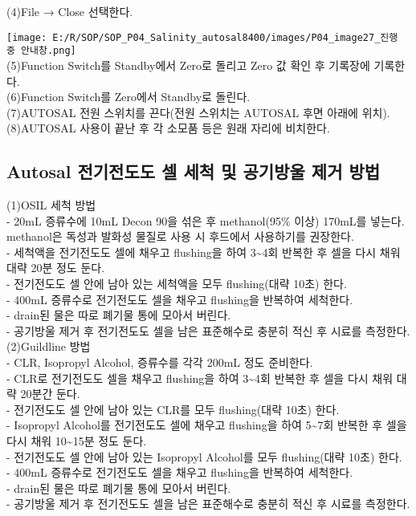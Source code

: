 \documentclass[
]{book}
\begin{document}
(4)File → Close 선택한다.

\texttt{[image: E:/R/SOP/SOP\_P04\_Salinity\_autosal8400/images/P04\_image27\_진행 중 안내창.png]}\\
(5)Function Switch를 Standby에서 Zero로 돌리고 Zero 값 확인 후 기록장에 기록한다.\\
(6)Function Switch를 Zero에서 Standby로 돌린다.\\
(7)AUTOSAL 전원 스위치를 끈다(전원 스위치는 AUTOSAL 후면 아래에 위치).\\
(8)AUTOSAL 사용이 끝난 후 각 소모품 등은 원래 자리에 비치한다.

\hypertarget{autosal-uxc804uxae30uxc804uxb3c4uxb3c4-uxc140-uxc138uxcc99-uxbc0f-uxacf5uxae30uxbc29uxc6b8-uxc81cuxac70-uxbc29uxbc95}{%
\subsection{Autosal 전기전도도 셀 세척 및 공기방울 제거 방법}\label{autosal-uxc804uxae30uxc804uxb3c4uxb3c4-uxc140-uxc138uxcc99-uxbc0f-uxacf5uxae30uxbc29uxc6b8-uxc81cuxac70-uxbc29uxbc95}}

(1)OSIL 세척 방법\\
- 20mL 증류수에 10mL Decon 90을 섞은 후 methanol(95\% 이상) 170mL를 넣는다. methanol은 독성과 발화성 물질로 사용 시 후드에서 사용하기를 권장한다.\\
- 세척액을 전기전도도 셀에 채우고 flushing을 하여 3\textasciitilde4회 반복한 후 셀을 다시 채워 대략 20분 정도 둔다.\\
- 전기전도도 셀 안에 남아 있는 세척액을 모두 flushing(대략 10초) 한다.\\
- 400mL 증류수로 전기전도도 셀을 채우고 flushing을 반복하여 세척한다.\\
- drain된 물은 따로 폐기물 통에 모아서 버린다.\\
- 공기방울 제거 후 전기전도도 셀을 남은 표준해수로 충분히 적신 후 시료를 측정한다.\\
(2)Guildline 방법\\
- CLR, Isopropyl Alcohol, 증류수를 각각 200mL 정도 준비한다.\\
- CLR로 전기전도도 셀을 채우고 flushing을 하여 3\textasciitilde4회 반복한 후 셀을 다시 채워 대략 20분간 둔다.\\
- 전기전도도 셀 안에 남아 있는 CLR를 모두 flushing(대략 10초) 한다.\\
- Isopropyl Alcohol를 전기전도도 셀에 채우고 flushing을 하여 5\textasciitilde7회 반복한 후 셀을 다시 채워 10\textasciitilde15분 정도 둔다.\\
- 전기전도도 셀 안에 남아 있는 Isopropyl Alcohol를 모두 flushing(대략 10초) 한다.\\
- 400mL 증류수로 전기전도도 셀을 채우고 flushing을 반복하여 세척한다.\\
- drain된 물은 따로 폐기물 통에 모아서 버린다.\\
- 공기방울 제거 후 전기전도도 셀을 남은 표준해수로 충분히 적신 후 시료를 측정한다.
\end{document}
